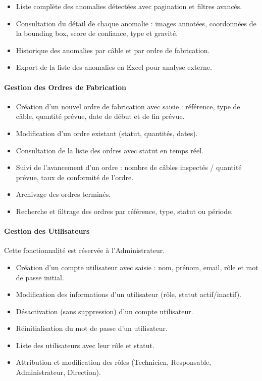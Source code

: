 \begin{itemize}
    \item Liste complète des anomalies détectées avec pagination et filtres avancés.
    \item Consultation du détail de chaque anomalie : images annotées, coordonnées de la bounding box, score de confiance, type et gravité.
    \item Historique des anomalies par câble et par ordre de fabrication.
    \item Export de la liste des anomalies en Excel pour analyse externe.
\end{itemize}

\paragraph{Gestion des Ordres de Fabrication}

\begin{itemize}
    \item Création d'un nouvel ordre de fabrication avec saisie : référence, type de câble, quantité prévue, date de début et de fin prévue.
    \item Modification d'un ordre existant (statut, quantités, dates).
    \item Consultation de la liste des ordres avec statut en temps réel.
    \item Suivi de l'avancement d'un ordre : nombre de câbles inspectés / quantité prévue, taux de conformité de l'ordre.
    \item Archivage des ordres terminés.
    \item Recherche et filtrage des ordres par référence, type, statut ou période.
\end{itemize}

\paragraph{Gestion des Utilisateurs}

Cette fonctionnalité est réservée à l'Administrateur.

\begin{itemize}
    \item Création d'un compte utilisateur avec saisie : nom, prénom, email, rôle et mot de passe initial.
    \item Modification des informations d'un utilisateur (rôle, statut actif/inactif).
    \item Désactivation (sans suppression) d'un compte utilisateur.
    \item Réinitialisation du mot de passe d'un utilisateur.
    \item Liste des utilisateurs avec leur rôle et statut.
    \item Attribution et modification des rôles (Technicien, Responsable, Administrateur, Direction).
\end{itemize}

